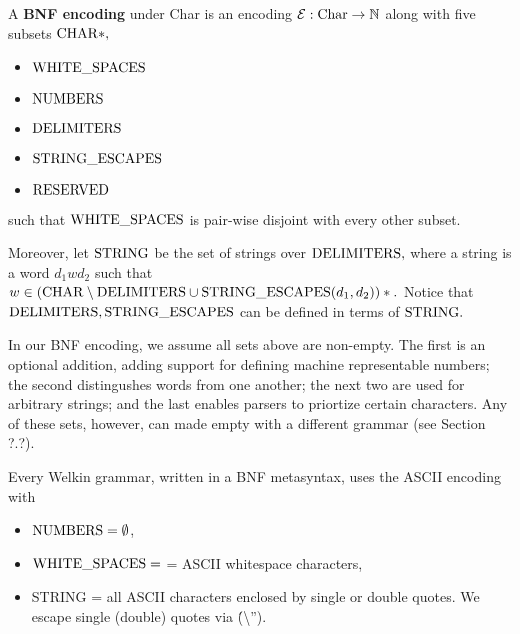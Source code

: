 \begin{definition}
  A \textbf{BNF encoding} under Char is an encoding $\mathcal{E}: \textrm{Char} \to \mathbb{N}$ along with five subsets $\mathrm{CHAR}*,$
  \begin{itemize}
  \item $\mathrm{WHITE\_SPACES}$
  \item $\mathrm{NUMBERS}$
  \item $\mathrm{DELIMITERS}$
  \item $\mathrm{STRING\_ESCAPES}$
  \item $\mathrm{RESERVED}$
  \end{itemize}
  such that $\mathrm{WHITE\_SPACES}$ is pair-wise disjoint with every other subset.

Moreover, let $\mathrm{STRING}$ be the set of strings over $\mathrm{DELIMITERS},$ where a string is a word $d_{1}wd_{2}$ such that $w \in (\mathrm{CHAR} \setminus \mathrm{DELIMITERS} \cup \mathrm{STRING\_ESCAPES}(d_{1}, d_{2}))*.$ Notice that $\mathrm{DELIMITERS}, \mathrm{STRING\_ESCAPES}$ can be defined in terms of $\mathrm{STRING}.$
\end{definition}
In our BNF encoding, we assume all sets above are non-empty. The first is an optional addition, adding support for defining machine representable numbers; the second distingushes words from one another; the next two are used for arbitrary strings; and the last enables parsers to priortize certain characters. Any of these sets, however, can made empty with a different grammar (see Section ?.?).





Every Welkin grammar, written in a BNF metasyntax, uses the ASCII encoding with
\begin{itemize}
  \item $\mathrm{NUMBERS} = \emptyset$,
  \item $\mathrm{WHITE\_SPACES} = $ = ASCII whitespace characters,
  \item STRING = all ASCII characters enclosed by single or double quotes. We escape single (double) quotes via \' (\textbackslash'').
\end{itemize}

